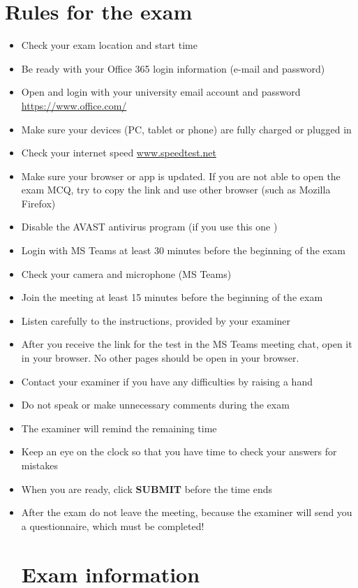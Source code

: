 \documentclass[13pt,a4paper]{article}
\begin{document}
	\section*{Rules for the exam}
	\begin{itemize}
		\item Check your exam location and start time
		\item Be ready with your Office 365 login information (e-mail and password) 
		\item Open and login with your university email account and password \href{https://www.office.com/}{https://www.office.com/}
		\item Make sure your devices (PC, tablet or phone) are fully charged or plugged in 
		\item Check your internet speed   \href{https://www.speedtest.net/}{www.speedtest.net}
		\item Make sure your browser or app is updated. If you are not able to open the exam MCQ, try to copy the link and use other browser (such as Mozilla Firefox)
		\item Disable the AVAST antivirus program (if you use this one )
		\item Login with MS Teams at least 30 minutes before the beginning of the exam 
		\item Check your camera and microphone  (MS Teams)
		\item Join the meeting at least 15 minutes before the beginning of the exam
		\item Listen carefully to the instructions, provided by your examiner
		\item After you receive the link for the test in the MS Teams meeting chat, open it in your browser. No other pages should be open in your browser.
		\item Contact your examiner if you have any difficulties by raising a hand 
		\item Do not speak or make unnecessary comments during the exam
		\item The examiner will remind the remaining time
		\item Keep an eye on the clock so that you have time to check your answers for mistakes
		\item When you are ready, click \textbf{SUBMIT} before the time ends
		\item After the exam do not leave the meeting, because the examiner will send you a questionnaire, which must be completed!
		\section*{Exam information}

\end{itemize}
\end{document}
